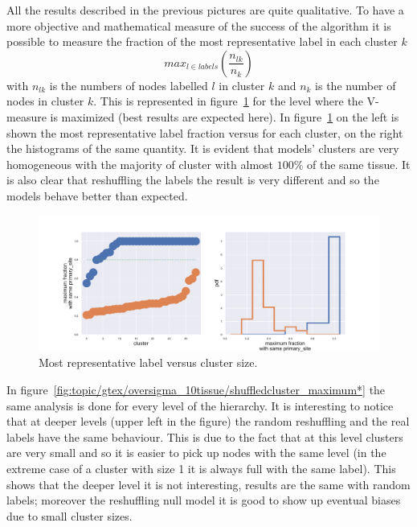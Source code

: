 All the results described in the previous pictures are quite qualitative. To have a more objective and mathematical measure of the success of the algorithm it is possible to measure the fraction of the most representative label in each cluster $k$
\[
max_{l\in labels}\left(\frac{n_{l k}}{n_k}\right)
\]
with $n_{l k}$ is the numbers of nodes labelled $l$ in cluster $k$ and $n_k$ is the number of nodes in cluster $k$. This is represented in figure~\ref{fig:gtex/oversigma_10tissue/shuffledcluster_maximum_l2_primary_site} for the level where the V-measure is maximized (best results are expected here). In figure~\ref{fig:gtex/oversigma_10tissue/shuffledcluster_maximum_l2_primary_site} on the left is shown the most representative label fraction versus for each cluster, on the right the histograms of the same quantity. It is evident that models' clusters are very homogeneous with the majority of cluster with almost $100\%$ of the same tissue. It is also clear that reshuffling the labels the result is very different and so the models behave better than expected. 
\begin{figure}[htb!]
    \centering
    \includegraphics[width=0.9\linewidth]{pictures/topic/gtex/oversigma_10tissue/shuffledcluster_maximum_l2_primary_site.pdf}
    \caption{Most representative label versus cluster size.}
    \label{fig:gtex/oversigma_10tissue/shuffledcluster_maximum_l2_primary_site}
\end{figure}
In figure~\ref{fig:topic/gtex/oversigma_10tissue/shuffledcluster_maximum*} the same analysis is done for every level of the hierarchy. It is interesting to notice that at deeper levels (upper left in the figure) the random reshuffling and the real labels have the same behaviour. This is due to the fact that at this level clusters are very small and so it is easier to pick up nodes with the same level (in the extreme case of a cluster with size 1 it is always full with the same label). This shows that the deeper level it is not interesting, results are the same with random labels;  moreover the reshuffling null model it is good to show up eventual biases due to small cluster sizes.
